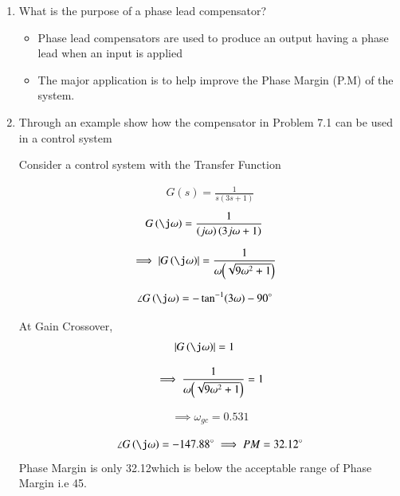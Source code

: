 \begin{enumerate}[label=\thesection.\arabic*.,ref=\thesection.\theenumi]

\item
What is the purpose of a phase lead compensator?

\solution 
\begin{itemize}
    \item Phase lead compensators are used to produce an output having a phase lead when an input is applied
    \item The major application is to help improve the Phase Margin (P.M) of the system.
\end{itemize}

\item
Through an example show how the compensator in Problem 7.1 can be used in a control system

Consider a control system with the Transfer Function

\begin{align}
G(s) = \frac{1}{s(3s+1)}
\end{align}
\begin{align}
G\brak{\j\omega}&=\frac{1}{\brak{j\omega}\brak{3j\omega+1}} 
\end{align}

\begin{align}
\implies 
\abs{G\brak{\j\omega}}&=\frac{1}{{\omega}{\brak{\sqrt{9\omega^2+1}}}}
\end{align}

\begin{align}
\angle G\brak{\j\omega}&=- \tan^{-1}(3\omega) - 90\degree
\end{align}

At Gain Crossover,
\begin{align}
\abs{G\brak{\j\omega}}&=1
\end{align}

\begin{align}
\implies \frac{1}{{\omega}{\left(\sqrt{9\omega^2+1}\right)}} =1
\end{align}

\begin{align}
\implies \omega_{gc} = 0.531
\end{align}

\begin{align}
\angle G\brak{\j\omega} = -147.88\degree
\implies PM=32.12\degree
\end{align}
Phase Margin is only 32.12\degree which is below the acceptable range of Phase Margin i.e 45\degree.


\end{enumerate}
